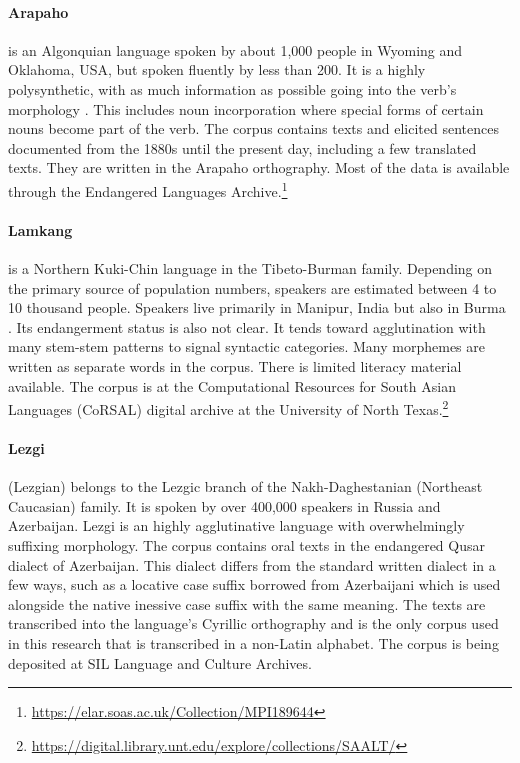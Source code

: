 \paragraph{Arapaho}
is an Algonquian language spoken by about 1,000 people in Wyoming and Oklahoma, USA, but spoken fluently by less than 200. It is a highly polysynthetic, with as much information as possible going into the verb's morphology \citep{cowell_arapaho_2008}. This includes noun incorporation where special forms of certain nouns become part of the verb. The corpus contains texts and elicited sentences documented from the 1880s until the present day, including a few translated texts. They are written in the Arapaho orthography. Most of the data is available through the Endangered Languages Archive.\footnote{\url{https://elar.soas.ac.uk/Collection/MPI189644}}

\paragraph{Lamkang} 
is a Northern Kuki-Chin language in the Tibeto-Burman family. Depending on the primary source of population numbers, speakers are estimated between 4 to 10 thousand people. Speakers live primarily in Manipur, India but also in Burma \cite{lamkang_2007}. Its endangerment status is also not clear. It tends toward agglutination with many stem-stem patterns to signal syntactic categories. Many morphemes are written as separate words in the corpus. There is limited literacy material available. The corpus is at the Computational Resources for South Asian Languages (CoRSAL) digital archive at the University of North Texas.\footnote{\url{https://digital.library.unt.edu/explore/collections/SAALT/}}

\paragraph{Lezgi} 
(Lezgian) belongs to the Lezgic branch of the Nakh-Daghestanian (Northeast Caucasian) family. It is spoken by over 400,000 speakers in Russia and Azerbaijan. Lezgi is an highly agglutinative language with overwhelmingly suffixing morphology. The corpus contains oral texts in the endangered Qusar dialect of Azerbaijan. This dialect differs from the standard written dialect in a few ways, such as a locative case suffix borrowed from Azerbaijani which is used alongside the native inessive case suffix with the same meaning. The texts are transcribed into the language's Cyrillic orthography and is the only corpus used in this research that is transcribed in a non-Latin alphabet. The corpus is being deposited at SIL Language and Culture Archives.

